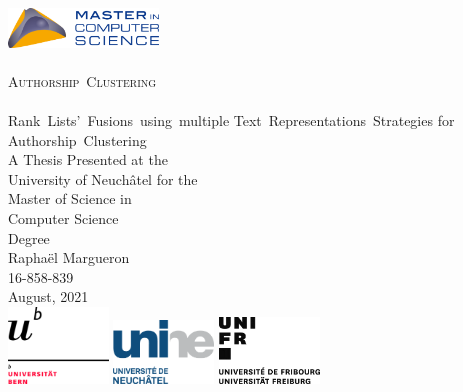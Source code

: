 \begin{titlepage}
  \vspace*{\fill}
  \begin{center}
    \includegraphics[width=0.30\textwidth]{img/MSc_quer.png}
    \\[1.5cm]
    \makebox[\linewidth]{\rule{0.8\paperwidth}{0.4pt}}
    \\[0.9cm]
    {\Huge \scshape Authorship~Clustering}
    \\[0.5cm]
    \makebox[\linewidth]{\rule{0.8\paperwidth}{0.4pt}}
    \\[0.5cm]
    {\Large Rank~Lists'~Fusions~using~multiple Text~Representations~Strategies for Authorship~Clustering}
    \\[2.0cm]
    {\large A Thesis Presented at the \\ University of Neuchâtel for the \\ Master of Science in \\ Computer Science \\ Degree}
    \\[3.5cm]
    {\Large Raphaël Margueron}
    \\
    {\large 16-858-839}
    \\[0.8cm]
    {\large August, 2021}
    \\[4.0cm]
    \includegraphics[width=0.20\textwidth]{img/UNI_Bern.png}
    \hfill
    \includegraphics[width=0.20\textwidth]{img/UNI_Neuenburg.png}
    \hfill
    \includegraphics[width=0.20\textwidth]{img/UNI_Fribourg.png}
  \end{center}
  \vspace*{\fill}
\end{titlepage}
